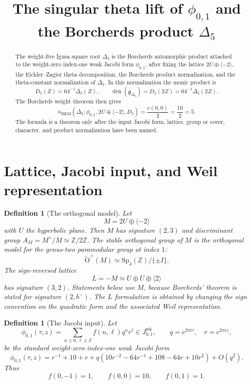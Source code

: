 \documentclass[11pt]{amsart}
\newtheorem{definition}[theorem]{Definition}
\newcommand{\kBKM}{\kappa_{\mathrm{BKM}}}
\newcommand{\ZZ}{\mathbb{Z}}
\newcommand{\Sp}{\mathrm{Sp}}
\newcommand{\OO}{\mathrm{O}}
\newcommand{\gDelta}{\mathfrak{g}_{\Delta_5}}
\newcommand{\phij}{\phi_{0,1}}
\newcommand{\Delfive}{\Delta_5}
\begin{document}
\title{The singular theta lift of \texorpdfstring{$\phij$}{phi01}
and the Borcherds product \texorpdfstring{$\Delfive$}{Delta5}}
\author{}
\date{}
\maketitle

\begin{abstract}
The weight-five Igusa square root \(\Delfive\) is the Borcherds
automorphic product attached to the weight-zero index-one weak Jacobi
form \(\phij\), after fixing the lattice \(2U\oplus\langle -2\rangle\),
the Eichler--Zagier theta decomposition, the Borcherds product
normalization, and the theta-constant normalization of \(\Delfive\).
In this normalization the monic product is
\[
 D_5(Z)=64^{-1}\Delfive(Z),
 \qquad
 \operatorname{den}(\gDelta)=D_5(2Z)=64^{-1}\Delfive(2Z).
\]
The Borcherds weight theorem then gives
\[
 \kBKM(\Delfive; \phij,2U\oplus\langle -2\rangle,D_5)
 =\frac{c(0,0)}2=\frac{10}{2}=5.
\]
The formula is a theorem only after the input Jacobi form, lattice,
group or cover, character, and product normalization have been named.
\end{abstract}

\tableofcontents

\section{Lattice, Jacobi input, and Weil representation}

\begin{definition}[The orthogonal model]
Let
\[
 M=2U\oplus\langle -2\rangle
\]
with \(U\) the hyperbolic plane.  Then \(M\) has signature \((2,3)\)
and discriminant group \(A_M=M^\vee/M\simeq \ZZ/2\ZZ\).  The stable
orthogonal group of \(M\) is the orthogonal model for the genus-two
paramodular group at index \(1\):
\[
 \widetilde{\OO}^{+}(M)\simeq \Sp_4(\ZZ)/\{\pm I\}.
\]
The sign-reversed lattice
\[
 L=-M\simeq U\oplus U\oplus\langle 2\rangle
\]
has signature \((3,2)\).  Statements below use \(M\), because
Borcherds' theorem is stated for signature \((2,b^-)\).  The \(L\)
formulation is obtained by changing the sign convention on the
quadratic form and the associated Weil representation.
\end{definition}

\begin{definition}[The Jacobi input]
Let
\[
 \phij(\tau,z)=\sum_{n\geq 0,\ell\in\ZZ} f(n,\ell)q^n r^\ell
 \in J^{\mathrm{wk}}_{0,1},
 \qquad q=e^{2\pi i\tau},\quad r=e^{2\pi i z},
\]
be the standard weight-zero index-one weak Jacobi form
\[
 \phij(\tau,z)
 =r^{-1}+10+r
 +q(10r^{-2}-64r^{-1}+108-64r+10r^2)+O(q^2).
\]
Thus
\[
 f(0,-1)=1,\qquad f(0,0)=10,\qquad f(0,1)=1.
\]
\end{definition}
\end{document}

